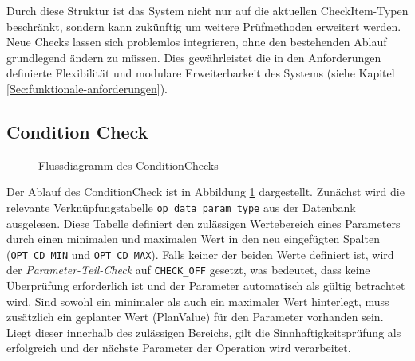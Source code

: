 Durch diese Struktur ist das System nicht nur auf die aktuellen CheckItem-Typen beschränkt, sondern kann zukünftig um weitere Prüfmethoden erweitert werden. Neue Checks lassen sich problemlos integrieren, ohne den bestehenden Ablauf grundlegend ändern zu müssen. Dies gewährleistet die in den Anforderungen definierte Flexibilität und modulare Erweiterbarkeit des Systems (siehe Kapitel \ref{Sec:funktionale-anforderungen}).

\subsection{Condition Check}
\begin{figure}[!htb]
    \centering
    \caption{Flussdiagramm des \gls{ConditionCheck}s}
    \label{fig:condition-check}
\end{figure}

Der Ablauf des \gls{ConditionCheck} ist in Abbildung \ref{fig:condition-check} dargestellt. Zunächst wird die relevante Verknüpfungstabelle \texttt{op\_data\_param\_type} aus der Datenbank ausgelesen. Diese Tabelle definiert den zulässigen Wertebereich eines Parameters durch einen minimalen und maximalen Wert in den neu eingefügten Spalten (\texttt{OPT\_CD\_MIN} und \texttt{OPT\_CD\_MAX}). Falls keiner der beiden Werte definiert ist, wird der \textit{Parameter-Teil-Check} auf \texttt{CHECK\_OFF} gesetzt, was bedeutet, dass keine Überprüfung erforderlich ist und der Parameter automatisch als gültig betrachtet wird. Sind sowohl ein minimaler als auch ein maximaler Wert hinterlegt, muss zusätzlich ein geplanter Wert (PlanValue) für den Parameter vorhanden sein. Liegt dieser innerhalb des zulässigen Bereichs, gilt die Sinnhaftigkeitsprüfung als erfolgreich und der nächste Parameter der Operation wird verarbeitet. 

